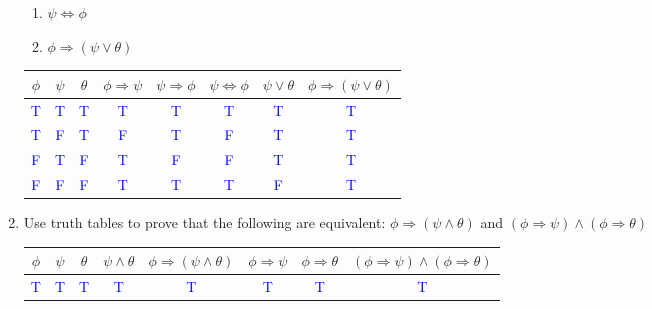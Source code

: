\documentclass[13.5pt]{article}
\begin{document}
\begin{enumerate}
\begin{enumerate}
\setlength{\itemindent}{.1in}
\item{\(\psi \Leftrightarrow \phi\)}
\item{\(\phi \Rightarrow (\psi \vee \theta)\)}
\end{enumerate}
\begin{center}
\begin{tabular}{c c c c c c c c}
 \(\phi\) & \(\psi\) & \(\theta\) & \(\phi \Rightarrow \psi\) & \(\psi \Rightarrow \phi\) & \(\psi \Leftrightarrow \phi\) & \(\psi \vee \theta\) & \(\phi \Rightarrow (\psi \vee \theta)\)\\ 
\hline
 \textcolor{blue}{T} & \textcolor{blue}{T} & \textcolor{blue}{T} & \textcolor{blue}{T} & \textcolor{blue}{T} & \textcolor{blue}{T} & \textcolor{blue}{T} & \textcolor{blue}{T} \\ 
 \textcolor{blue}{T} & \textcolor{blue}{F} & \textcolor{blue}{T} & \textcolor{blue}{F} & \textcolor{blue}{T} & \textcolor{blue}{F} & \textcolor{blue}{T} & \textcolor{blue}{T} \\ 
 \textcolor{blue}{F} & \textcolor{blue}{T} & \textcolor{blue}{F} & \textcolor{blue}{T} & \textcolor{blue}{F} & \textcolor{blue}{F} & \textcolor{blue}{T} & \textcolor{blue}{T} \\ 
 \textcolor{blue}{F} & \textcolor{blue}{F} & \textcolor{blue}{F} & \textcolor{blue}{T} & \textcolor{blue}{T} & \textcolor{blue}{T} & \textcolor{blue}{F} & \textcolor{blue}{T} \\ 
\end{tabular}
\end{center}

\item{Use truth tables to prove that the following are equivalent:  \(\phi \Rightarrow (\psi \wedge \theta)\) and \((\phi \Rightarrow \psi) \wedge (\phi \Rightarrow \theta)\)}\

\begin{center}
\begin{tabular}{c c c c c c c c}
 \(\phi\) & \(\psi\) & \(\theta\) & \(\psi \wedge \theta\) & \(\phi \Rightarrow (\psi \wedge \theta)\) & \(\phi \Rightarrow \psi\) & \(\phi \Rightarrow \theta\) & \((\phi \Rightarrow \psi) \wedge (\phi \Rightarrow \theta)\) \\
\hline

 \textcolor{blue}{T} & \textcolor{blue}{T} & \textcolor{blue}{T} & \textcolor{blue}{T} & \textcolor{blue}{T} & \textcolor{blue}{T} & \textcolor{blue}{T} & \textcolor{blue}{T}\\ 
 

\end{tabular}
\end{center}
\end{enumerate}
\end{document}
